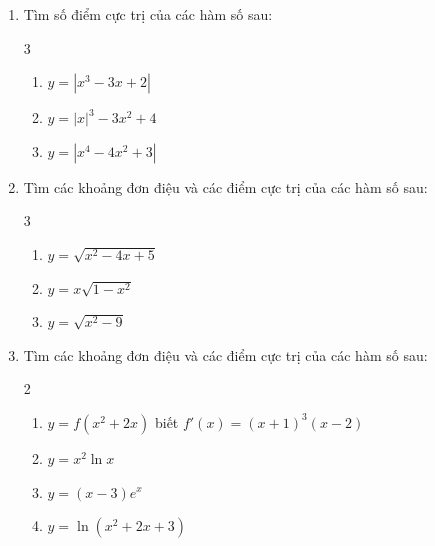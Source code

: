 \documentclass[12pt]{article}
\begin{document}
	\begin{btvang}
		
		\begin{enumerate}[label=\textbf{Bài \arabic*.}]
			\item Tìm số điểm cực trị của các hàm số sau:
			\begin{multicols}{3}
				\begin{enumerate}[label=\alph*)]
					\item $y = |x^3 - 3x + 2|$
					\item $y = |x|^3 - 3x^2 + 4$
					\item $y = |x^4 - 4x^2 + 3|$
				\end{enumerate}
			\end{multicols}
			
			\item Tìm các khoảng đơn điệu và các điểm cực trị của các hàm số sau:
			\begin{multicols}{3}
				\begin{enumerate}[label=\alph*)]
					\item $y = \sqrt{x^2 - 4x + 5}$
					\item $y = x\sqrt{1 - x^2}$
					\item $y = \sqrt{x^2 - 9}$
				\end{enumerate}
			\end{multicols}
			
			\item Tìm các khoảng đơn điệu và các điểm cực trị của các hàm số sau:
			\begin{multicols}{2}
				\begin{enumerate}[label=\alph*)]
					\item $y = f(x^2 + 2x)$ biết $f'(x) = (x + 1)^3(x - 2)$
					\item $y = x^2 \ln x$
					\item $y = (x - 3)e^x$
					\item $y = \ln(x^2 + 2x + 3)$
				\end{enumerate}
			\end{multicols}
		\end{enumerate}
	\end{btvang}
	
\end{document}
